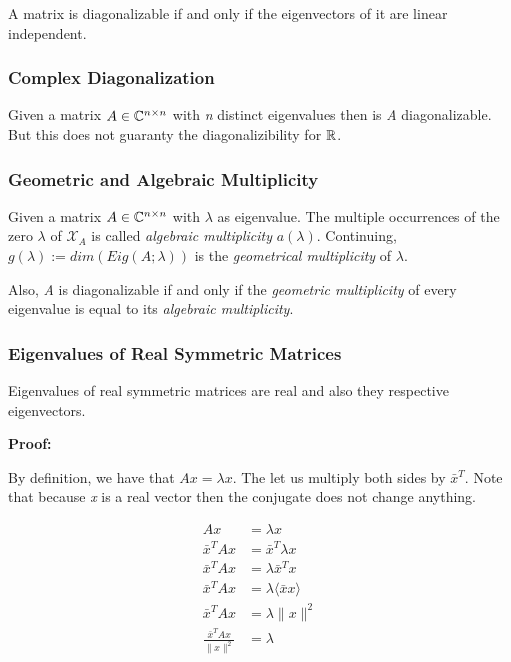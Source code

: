 A matrix is diagonalizable if and only if the eigenvectors of it are linear independent.

\subsubsection{Complex Diagonalization}

Given a matrix \(A \in \mathbb{C}^{n \times n}\) with \emph{n} distinct eigenvalues then is \emph{A}
diagonalizable. But this does not guaranty the diagonalizibility for \(\mathbb{R}\).

\subsubsection{Geometric and Algebraic Multiplicity}

Given a matrix \(A \in \mathbb{C}^{n \times n}\) with \(\lambda\) as eigenvalue. The multiple occurrences 
of the zero \(\lambda\) of \(\mathcal{X}_A\) is called \emph{algebraic multiplicity} \(a(\lambda)\). 
Continuing, \(g(\lambda):= dim(Eig(A;\lambda))\) is the \emph{geometrical multiplicity} of \(\lambda\).
\vspace{\baselineskip}

Also, \emph{A} is diagonalizable if and only if the \emph{geometric multiplicity} of every eigenvalue is equal 
to its \emph{algebraic multiplicity}.

\subsubsection{Eigenvalues of Real Symmetric Matrices}

Eigenvalues of real symmetric matrices are real and also they respective eigenvectors.
\vspace{\baselineskip}

\textbf{Proof:}

By definition, we have that \(Ax = \lambda x\). The let us multiply both sides by \( \bar{x}^T\). Note 
that because \emph{x} is a real vector then the conjugate does not change anything.

\begin{align*}
    Ax &= \lambda x \\
    \bar{x}^T A x &= \bar{x}^T \lambda x \\
    \bar{x}^T A x &= \lambda \bar{x}^T x \\
    \bar{x}^T A x &= \lambda \langle \bar{x} x \rangle\\
    \bar{x}^T A x &= \lambda \|x\|^2\\
    \frac{\bar{x}^T A x}{\|x\|^2} &= \lambda
\end{align*}

